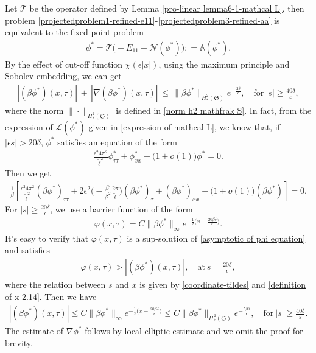 \documentclass[10pt, reqno]{amsart}
\numberwithin{equation}{section}
\theoremstyle{definition}
\begin{document}
{{\medskip
Let ${\mathcal T}$ be the operator defined by Lemma \ref{pro-linear lemma6-1-mathcal L},
then problem \eqref{projectedproblem1-refined-e11}-\eqref{projectedproblem3-refined-aa} is equivalent to the fixed-point problem
\begin{align} \label{mathbb-A}
 \phi^* ={\mathcal T}\big(-E_{11} +{\mathcal N}(\phi^*)\big) : =\mathbb A (\phi^*).
\end{align}
 By the effect of cut-off function $\chi(\epsilon|x|)$, using the maximum principle and Sobolev embedding, we can get
\begin{align*}
 |\left(\beta\phi^*\right)(x, \tau)| \,+\, |\nabla\left(\beta\phi^*\right)(x, \tau)| \,\leq\, \|\beta\phi^*\|_{H^2_*(\mathfrak S)} e^{-\frac{2\delta} \epsilon}, \quad \text{for}~|s|\geq \frac{40\delta}{\varepsilon},
\end{align*}
 where the norm $\|\cdot\|_{H^2_*(\mathfrak S)} $ is defined in \eqref{norm h2 mathfrak S}.
 In fact, from the expression of $\mathcal L (\phi^*)$ given in \eqref{expression of mathcal L}, we know that, if $|\epsilon s|>20 \delta$, $\phi^*$ satisfies an equation of the form
\begin{align} \label{asymptotic of phi equation}
\frac{\epsilon^2 4\pi^2}{{\tilde\ell}^2} \phi^*_{\tau\tau} + \phi^*_{xx} - \big(1+ o(1)\big)\phi^* = 0.
\end{align}
Then
we get
\begin{align*}
\frac1\beta\left[\frac{\epsilon^2 4\pi^2}{{\tilde\ell}^2} \left(\beta \phi^*\right)_{\tau\tau} +2\epsilon^2\Big(-\frac{\beta'}{\beta^2} \frac{2\pi}{\tilde \ell} \Big)\left(\beta \phi^*\right)_\tau+ \left(\beta \phi^*\right)_{xx} - \big(1+ o(1)\big) \left(\beta \phi^*\right) \right] = 0.
\end{align*}
For $|s|\geq \frac{20 \delta} {\epsilon}$, we use a barrier function of the form
\begin{align*}
\varphi(x, \tau) = C \|\beta \phi^*\|_{\infty} e^{-\frac12\big(x- \frac{20\beta\delta}{\epsilon}\big)}.
\end{align*}
It's easy to verify that $\varphi(x, \tau) $ is a sup-solution of \eqref{asymptotic of phi equation}
and satisfies
\begin{align*}
\varphi(x, \tau) > \left|\left(\beta \phi^*\right)(x, \tau)\right|,
\quad
\mbox{at}\ s= \frac{20\delta}{\epsilon},
\end{align*}
where the relation between $s$ and $x$ is given by \eqref{coordinate-tildes} and \eqref{definition of x 2.14}.
Then we have
\begin{align*}
 |\left(\beta\phi^*\right)(x, \tau)| \leq C \|\beta \phi^*\|_\infty e^{-\frac12\big(x- \frac{20\beta\delta}{\epsilon}\big)}
 \leq C \|\beta \phi^*\|_{H^2_*(\mathfrak S)} e^{-\frac{5 \beta \delta} \epsilon},
 \quad \text{for}~|s|\geq \frac{40\delta}{\varepsilon}.
\end{align*}
The estimate of $\nabla \phi^*$ follows by local elliptic estimate and we omit the proof for brevity.


}}
\end{document}

